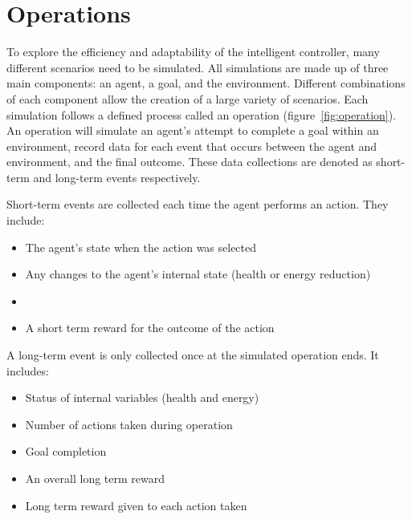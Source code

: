 \section{Operations} \label{sec:operations}
To explore the efficiency and adaptability of the intelligent controller, many different scenarios need to be simulated.
All simulations are made up of three main components: an agent, a goal, and the environment.
Different combinations of each component allow the creation of a large variety of scenarios.
Each simulation follows a defined process called an operation (figure~\ref{fig:operation}).
An operation will simulate an agent's attempt to complete a goal within an environment, record data for each event that occurs between the agent and environment, and the final outcome.
These data collections are denoted as short-term and long-term events respectively.

\noindent
Short-term events are collected each time the agent performs an action.
They include:

\begin{itemize}
  \setlength\itemsep{-12pt}
  \item The agent's state when the action was selected
  \item Any changes to the agent's internal state (health or energy reduction)
  \item {}
  \setlength\itemsep{0pt}
  \item A short term reward for the outcome of the action
\end{itemize}

\noindent
A long-term event is only collected once at the simulated operation ends.
It includes:

\begin{itemize}
  \setlength\itemsep{-12pt}
  \item Status of internal variables (health and energy)
  \item Number of actions taken during operation
  \item Goal completion
  \item An overall long term reward
  \item Long term reward given to each action taken
\end{itemize}

